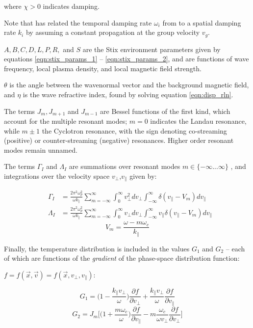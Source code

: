where $\chi > 0$ indicates damping.

Note that \citeauthor{Brinca1972} has related the temporal damping rate $\omega_i$ from \cite{Kennel1966} to a spatial damping rate $k_i$ by assuming a constant propagation at the group velocity $v_g$.

$A, B, C, D, L, P, R,$ and $S$ are the Stix environment parameters given by equations \eqref{eqn:stix_params_1} -- \eqref{eqn:stix_params_2}, and are functions of wave frequency, local plasma density, and local magnetic field strength. 

$\theta$ is the angle between the wavenormal vector and the background magnetic field, and $\eta$ is the wave refractive index, found by solving equation \eqref{eqn:disp_rln}.

The terms $J_m, J_{m+1}$ and $J_{m-1}$ are Bessel functions of the first kind, which account for the multiple resonant modes; $m=0$ indicates the Landau resonance, while $m\pm1$ the Cyclotron resonance, with the sign denoting co-streaming (positive) or counter-streaming (negative) resonances. Higher order resonant modes remain unnamed. 

The terms $\Gamma_I$ and $\Lambda_I$ are summations over resonant modes $m\in \{-\infty...\infty\}$ , and integrations over the velocity space $v_\perp$,$v_\parallel$ given by:

\begin{eqnarray}
&\Gamma_I &= \frac{2\pi^2\omega_p^2}{\omega k_\parallel} \sum_{m=-\infty}^{\infty}\int_0^\infty v_\perp^2 dv_\perp \int_{-\infty}^\infty \delta(v_\parallel - V_m) d v_\parallel \\
&\Lambda_I &= \frac{2\pi^2\omega_p^2}{\omega k_\parallel} \sum_{m=-\infty}^{\infty}\int_0^\infty v_\perp dv_\perp \int_{-\infty}^\infty v_\parallel \delta(v_\parallel - V_m) d v_\parallel
\end{eqnarray}
\begin{equation}
V_m = \frac{\omega - m\omega_c}{k_\parallel}
\end{equation}

Finally, the temperature distribution is included in the values $G_1$ and $G_2$ -- each of which are functions of the \emph{gradient} of the phase-space distribution function:

 $f=f(\vec{x}, \vec{v}) = f(\vec{x}, v_\perp, v_\parallel)$:

\begin{equation}
G_1 = \bigg(1 - \frac{k_\parallel v_\perp}{\omega}\bigg)\frac{\partial f}{\partial v_\perp} + \frac{k_\parallel v_\perp}{\omega}\frac{\partial f}{\partial v_\parallel}
\end{equation}
\begin{equation}
G_2 = J_m\bigg[\bigg(1 + \frac{m \omega_c}{\omega}\bigg)\frac{\partial f}{\partial v_\parallel} - m \frac{\omega_c}{\omega v_\perp} \frac{\partial f}{\partial v_\perp}\bigg]
\end{equation}

